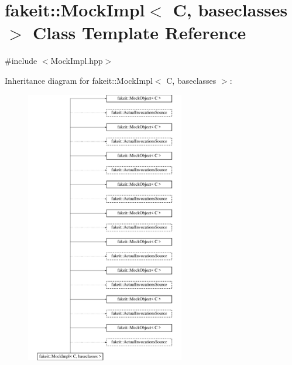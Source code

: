 \hypertarget{classfakeit_1_1MockImpl}{}\section{fakeit\+::Mock\+Impl$<$ C, baseclasses $>$ Class Template Reference}
\label{classfakeit_1_1MockImpl}


{\ttfamily \#include $<$Mock\+Impl.\+hpp$>$}

Inheritance diagram for fakeit\+::Mock\+Impl$<$ C, baseclasses $>$\+:\begin{figure}[H]
\begin{center}
\leavevmode
\includegraphics[height=12.000000cm]{classfakeit_1_1MockImpl}
\end{center}
\end{figure}

